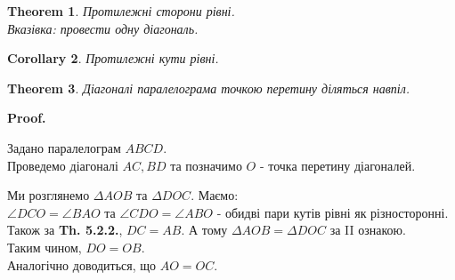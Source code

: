 \documentclass[a4paper, 10pt]{article}
\makeatletter
\def\qed{$\blacksquare$}
\theoremstyle{theoremdd}
\newtheorem{theorem}{Theorem}[subsection]
\theoremstyle{theoremdd}
\theoremstyle{theoremdd}
\theoremstyle{theoremdd}
\theoremstyle{theoremdd}
\theoremstyle{theoremdd}
\theoremstyle{theoremdd}
\theoremstyle{theoremdd}
\theoremstyle{theoremdd}
\newtheorem{corollary}[theorem]{Corollary}
\renewenvironment{proof}[1][Proof.\\]{\par
\pushQED{\hfill \qed}%
\normalfont \topsep6\p@\@plus6\p@\relax
\trivlist
\item\relax
{\bfseries
#1\@addpunct{.}}\hspace\labelsep\ignorespaces
}{%
\popQED\endtrivlist\@endpefalse
}
\makeatother
\begin{document}
\begin{theorem}
Протилежні сторони рівні.\\
\textit{Вказівка: провести одну діагональ.}
\end{theorem}

\begin{corollary}
Протилежні кути рівні.
\end{corollary}

\begin{theorem}
Діагоналі паралелограма точкою перетину діляться навпіл.
\end{theorem}

\begin{proof}
Задано паралелограм $ABCD$.\\
Проведемо діагоналі $AC,BD$ та позначимо $O$ - точка перетину діагоналей.
\begin{figure}[H]
\centering
{}
\end{figure}
Ми розглянемо $\Delta AOB$ та $\Delta DOC$. Маємо:\\
$\angle DCO = \angle BAO$ та $\angle CDO = \angle ABO$ - обидві пари кутів рівні як різносторонні. Також за \textbf{Th. 5.2.2.}, $DC = AB$. А тому $\Delta AOB = \Delta DOC$ за II ознакою.\\
Таким чином, $DO = OB$.\\
Аналогічно доводиться, що $AO = OC$.
\end{proof}
\end{document}
